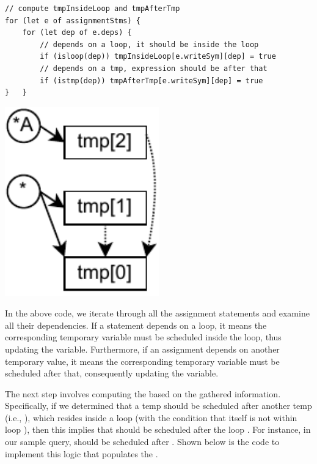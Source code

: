 \documentclass[runningheads]{llncs}
\begin{document}
\begin{minipage}{0.7\textwidth}
\begin{lstlisting}[style=JavaScript, columns=flexible]
// compute tmpInsideLoop and tmpAfterTmp
for (let e of assignmentStms) {
    for (let dep of e.deps) {
        // depends on a loop, it should be inside the loop
        if (isloop(dep)) tmpInsideLoop[e.writeSym][dep] = true
        // depends on a tmp, expression should be after that
        if (istmp(dep)) tmpAfterTmp[e.writeSym][dep] = true
}   }
\end{lstlisting}
\end{minipage}
\begin{minipage}{0.3\textwidth}
\includegraphics[width=0.5\textwidth]{images/q3_deps.pdf}
\end{minipage}

In the above code, we iterate through all the assignment statements and examine all
their dependencies.
If a statement depends on a loop, it means the corresponding temporary variable must
be scheduled inside the loop, thus updating the  variable.
Furthermore, if an assignment depends on another temporary value, it means the
corresponding temporary variable must be scheduled after that, consequently updating
the  variable.

The next step involves computing the  based on the gathered information.
Specifically, if we determined that a temp  should be scheduled after
another temp  (i.e., ), which resides inside a loop 
(with the condition that  itself is not within loop ),
then this implies that  should be scheduled after the loop .
For instance, in our sample query,  should be scheduled after .
Shown below is the code to implement this logic that populates the .
\end{document}
